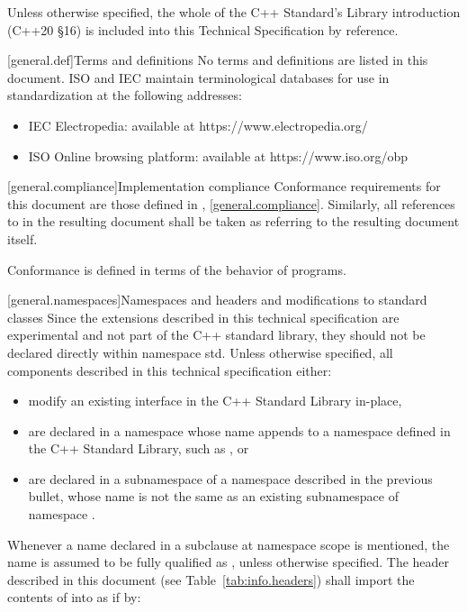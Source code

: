 \pnum
Unless otherwise specified, the whole of the C++ Standard's Library introduction (C++20 §16) is included into this Technical Specification by reference.


[general.def]{Terms and definitions}
\pnum
{}%
No terms and definitions are listed in this document. ISO and IEC maintain
terminological databases for use in standardization at the following addresses:

\begin{itemize}
    \item IEC Electropedia: available at https://www.electropedia.org/
    \item ISO Online browsing platform: available at https://www.iso.org/obp
\end{itemize}

[general.compliance]{Implementation compliance}
\pnum
Conformance requirements for this document are those defined in {\cppstddocno}, \ref{general.compliance}. Similarly, all references to {\cppstddocno} in the resulting document shall be taken as referring to the resulting document itself.
\begin{note}
Conformance is defined in terms of the behavior of programs.
\end{note}


[general.namespaces]{Namespaces and headers and modifications to standard classes}
\pnum
Since the extensions described in this technical specification are experimental and not part of the C++ standard library, they should not be declared directly within namespace std. Unless otherwise specified, all components described in this technical specification either:

\begin{itemize}
    \item modify an existing interface in the C++ Standard Library in-place,
    \item are declared in a namespace whose name appends  to a namespace defined in the C++ Standard Library, such as , or
    \item are declared in a subnamespace of a namespace described in the previous bullet, whose name is not the same as an existing subnamespace of namespace .
\end{itemize}

\pnum
Whenever a name  declared in a subclause at namespace scope
is mentioned, the name  is assumed to be fully qualified as
, unless otherwise specified.
The header described in this document (see Table~\ref{tab:info.headers})
shall import the contents of  into
 as if by:

